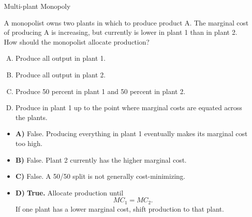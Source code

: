 \documentclass{beamer}
\begin{document}
\begin{frame}{Multi-plant Monopoly}


  A monopolist owns two plants in which to produce product A.  The marginal cost of producing A is increasing, but currently is lower in plant 1 than in plant 2.  How should the monopolist allocate production?

  \begin{enumerate}[A)]
    \item Produce all output in plant 1.
    \item Produce all output in plant 2.
    \item Produce 50 percent in plant 1 and 50 percent in plant 2.
    \item Produce in plant 1 up to the point where marginal costs are equated across the plants.
  \end{enumerate}
\end{frame}

\begin{frame}


\bigskip

\begin{itemize}
    \item \textbf{A)} False. Producing everything in plant 1 eventually makes its marginal cost too high.
    
    \item \textbf{B)} False. Plant 2 currently has the higher marginal cost.
    
    \item \textbf{C)} False. A 50/50 split is not generally cost-minimizing.
    
    \item \textbf{D)} \textbf{True.} Allocate production until
    \[
    MC_1 = MC_2.
    \]
    If one plant has a lower marginal cost, shift production to that plant.
\end{itemize}

\bigskip
\begin{center}
\end{center}

\end{frame}

\end{document}
